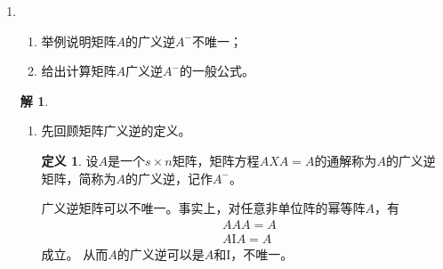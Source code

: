\documentclass[10pt]{article}
\theoremstyle{definition}
\newtheorem*{solution}{解}
\theoremstyle{definition}
\newtheorem*{definition}{定义}
\begin{document}
\begin{enumerate}
    \item	%
        \begin{enumerate}[label=(\roman*)]
            \item 举例说明矩阵$A$的广义逆$A^-$不唯一；
            \item 给出计算矩阵$A$广义逆$A^-$的一般公式。 
        \end{enumerate}

        \begin{solution}
            \begin{enumerate}[label=(\roman*)]
                \item
                    先回顾矩阵广义逆的定义。
                    \begin{definition}
                        设$A$是一个$s\times n$矩阵，矩阵方程$AXA=A$的通解称为$A$的广义逆矩阵，简称为$A$的广义逆，记作$A^{-}$。
                    \end{definition}
                    广义逆矩阵可以不唯一。事实上，对任意非单位阵的幂等阵$A$，有
                    \begin{equation*}
                        \begin{aligned}
        & AAA=A \\
        & A\mathrm{I}A=A
                        \end{aligned}
                    \end{equation*}
                    成立。
                    从而$A$的广义逆可以是$A$和$\mathrm{I}$，不唯一。


\end{enumerate}
\end{solution}
\end{enumerate}
\end{document}
